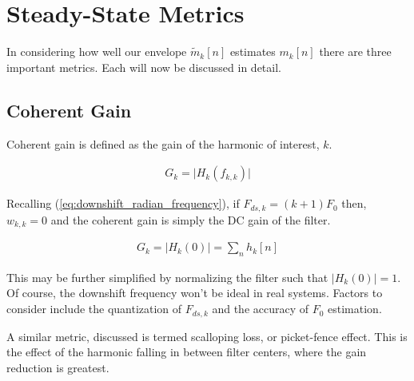 \documentclass [11pt, proquest,oneside] {ganter_thesis}[2015/03/03]
\begin{document}
\clearpage

\section{Steady-State Metrics}

In considering how well our envelope $\tilde{m}_k[n]$ estimates $m_k[n]$ there are three important metrics.  Each will now be discussed in detail.

\subsection{Coherent Gain}

Coherent gain is defined as the gain of the harmonic of interest, $k$.

\begin{align}
G_k = \Big| H_k(f_{k,k}) \Big|
\end{align}

Recalling (\ref{eq:downshift_radian_frequency}), if $F_{ds,k} = (k+1)F_0$ then, $w_{k,k} = 0$ and the coherent gain is simply the DC gain of the filter.

\begin{align}
G_k = \Big| H_k(0) \Big| = \sum_n h_k[n]
\end{align}

This may be further simplified by normalizing the filter such that $\Big| H_k(0) \Big| = 1$.  Of course, the downshift frequency won't be ideal in real systems.  Factors to consider include the quantization of $F_{ds,k}$ and the accuracy of $F_0$ estimation.

A similar metric, discussed \cite{harris1978use} is termed scalloping loss, or picket-fence effect.  This is the effect of the harmonic falling in between filter centers, where the gain reduction is greatest.




\end{document}
